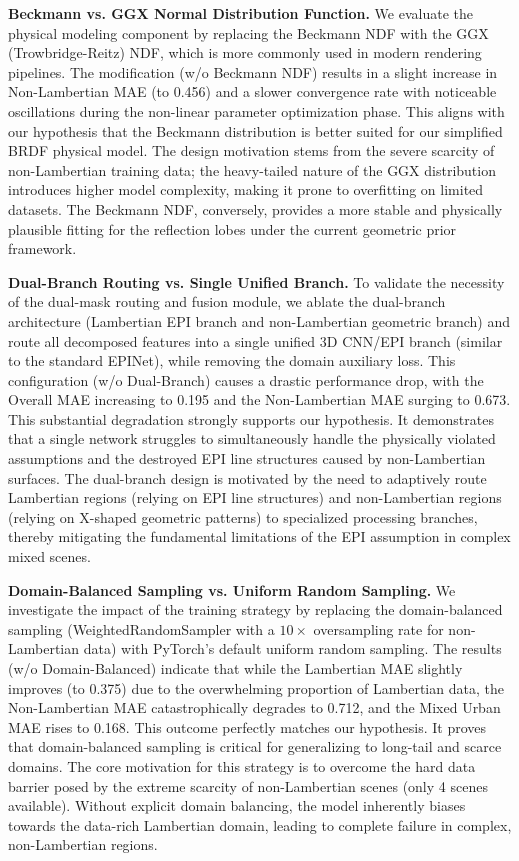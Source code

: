 \textbf{Beckmann vs. GGX Normal Distribution Function.} 
We evaluate the physical modeling component by replacing the Beckmann NDF with the GGX (Trowbridge-Reitz) NDF, which is more commonly used in modern rendering pipelines. The modification (w/o Beckmann NDF) results in a slight increase in Non-Lambertian MAE (to 0.456) and a slower convergence rate with noticeable oscillations during the non-linear parameter optimization phase. This aligns with our hypothesis that the Beckmann distribution is better suited for our simplified BRDF physical model. The design motivation stems from the severe scarcity of non-Lambertian training data; the heavy-tailed nature of the GGX distribution introduces higher model complexity, making it prone to overfitting on limited datasets. The Beckmann NDF, conversely, provides a more stable and physically plausible fitting for the reflection lobes under the current geometric prior framework.

\textbf{Dual-Branch Routing vs. Single Unified Branch.} 
To validate the necessity of the dual-mask routing and fusion module, we ablate the dual-branch architecture (Lambertian EPI branch and non-Lambertian geometric branch) and route all decomposed features into a single unified 3D CNN/EPI branch (similar to the standard EPINet), while removing the domain auxiliary loss. This configuration (w/o Dual-Branch) causes a drastic performance drop, with the Overall MAE increasing to 0.195 and the Non-Lambertian MAE surging to 0.673. This substantial degradation strongly supports our hypothesis. It demonstrates that a single network struggles to simultaneously handle the physically violated assumptions and the destroyed EPI line structures caused by non-Lambertian surfaces. The dual-branch design is motivated by the need to adaptively route Lambertian regions (relying on EPI line structures) and non-Lambertian regions (relying on X-shaped geometric patterns) to specialized processing branches, thereby mitigating the fundamental limitations of the EPI assumption in complex mixed scenes.

\textbf{Domain-Balanced Sampling vs. Uniform Random Sampling.} 
We investigate the impact of the training strategy by replacing the domain-balanced sampling (WeightedRandomSampler with a $10\times$ oversampling rate for non-Lambertian data) with PyTorch's default uniform random sampling. The results (w/o Domain-Balanced) indicate that while the Lambertian MAE slightly improves (to 0.375) due to the overwhelming proportion of Lambertian data, the Non-Lambertian MAE catastrophically degrades to 0.712, and the Mixed Urban MAE rises to 0.168. This outcome perfectly matches our hypothesis. It proves that domain-balanced sampling is critical for generalizing to long-tail and scarce domains. The core motivation for this strategy is to overcome the hard data barrier posed by the extreme scarcity of non-Lambertian scenes (only 4 scenes available). Without explicit domain balancing, the model inherently biases towards the data-rich Lambertian domain, leading to complete failure in complex, non-Lambertian regions.


